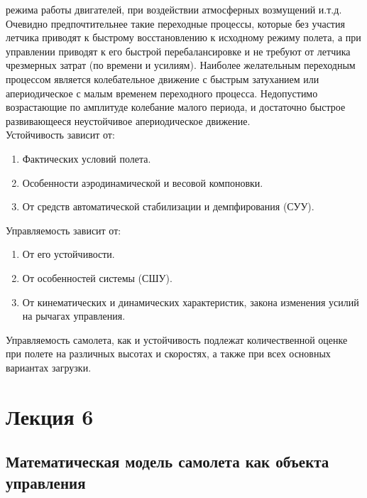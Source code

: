 \documentclass{article}
\begin{document}
режима работы двигателей, при воздействии атмосферных возмущений и.т.д.
Очевидно предпочтительнее такие переходные процессы, которые без участия
летчика приводят к быстрому восстановлению к исходному режиму полета, а при
управлении приводят к его быстрой перебалансировке и не требуют от летчика
чрезмерных затрат (по времени и усилиям). Наиболее желательным переходным
процессом является колебательное движение с быстрым затуханием или
апериодическое с малым временем переходного процесса. Недопустимо возрастающие
по амплитуде колебание малого периода, и достаточно быстрое развивающееся
неустойчивое апериодическое движение.\\
Устойчивость зависит от:
\begin{enumerate}
    \item Фактических условий полета.
    \item Особенности аэродинамической и весовой компоновки.
    \item От средств автоматической стабилизации и демпфирования (СУУ).
\end{enumerate}
Управляемость зависит от:
\begin{enumerate}
    \item От его устойчивости.
    \item От особенностей системы (СШУ).
    \item От кинематических и динамических характеристик, закона изменения
        усилий на рычагах управления.
\end{enumerate}

Управляемость самолета, как и устойчивость подлежат количественной оценке при
полете на различных высотах и скоростях, а также при всех основных вариантах
загрузки.

\newpage
\section{Лекция 6}
\subsection{Математическая модель самолета как объекта управления}
\end{document}
